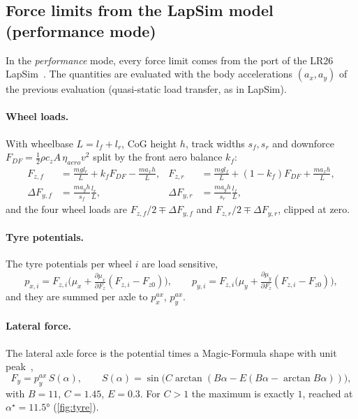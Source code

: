 \documentclass[11pt]{article}
\begin{document}
\subsection{Force limits from the LapSim model (performance mode)}\label{sec:perfmode}
In the \emph{performance} mode, every force limit comes from the port of the LR26 LapSim~\cite{perflab}. The
quantities are evaluated with the body accelerations $(a_x, a_y)$ of the previous evaluation (quasi-static load
transfer, as in LapSim).

\paragraph{Wheel loads.} With wheelbase $L=l_f+l_r$, CoG height $h$, track widths $s_f, s_r$ and downforce
$F_{DF} = \tfrac12\rho c_z A\,\eta_{aero} v^2$ split by the front aero balance $k_f$:
\begin{align}
F_{z,f} &= \frac{m g l_r}{L} + k_f F_{DF} - \frac{m a_x h}{L}, &
F_{z,r} &= \frac{m g l_f}{L} + (1-k_f) F_{DF} + \frac{m a_x h}{L},\\
\Delta F_{y,f} &= \frac{m a_y h}{s_f}\frac{l_r}{L}, &
\Delta F_{y,r} &= \frac{m a_y h}{s_r}\frac{l_f}{L},
\end{align}
and the four wheel loads are $F_{z,f}/2 \mp \Delta F_{y,f}$ and $F_{z,r}/2 \mp \Delta F_{y,r}$, clipped at zero.

\paragraph{Tyre potentials.} The tyre potentials per wheel $i$ are load sensitive,
\begin{equation}
p_{x,i} = F_{z,i}\big(\mu_x + \tfrac{\partial\mu_x}{\partial F_z}(F_{z,i}-F_{z0})\big),\qquad
p_{y,i} = F_{z,i}\big(\mu_y + \tfrac{\partial\mu_y}{\partial F_z}(F_{z,i}-F_{z0})\big),
\end{equation}
and they are summed per axle to $p_x^{ax}$, $p_y^{ax}$.

\paragraph{Lateral force.} The lateral axle force is the potential times a Magic-Formula shape with unit
peak~\cite{pacejka2012},
\begin{equation}
F_y = p_y^{ax}\,S(\alpha),\qquad S(\alpha) = \sin\!\big(C\arctan(B\alpha - E(B\alpha-\arctan B\alpha))\big),
\label{eq:shape}
\end{equation}
with $B=11$, $C=1.45$, $E=0.3$. For $C>1$ the maximum is exactly $1$, reached at $\alpha^\star = \ang{11.5}$
(\cref{fig:tyre}).
\end{document}

